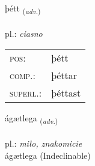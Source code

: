\documentclass[frontgrid, backgrid]{flacards}\usepackage[]{graphicx}\usepackage[]{xcolor}
\begin{document}
\renewcommand{\blhead}{\vskip5pt {\small\bfseries\footnotesize Atviksorð | Adverb }}
\renewcommand{\bcfoot}{\vskip5pt \hspace{2pt}{\small\bfseries\footnotesize 2K}}


{þétt \small{\textsubscript{(\textit{adv.})}} \\[1ex] %
\textphonetic{[θjɛht]} \\
pl.: \emph{ciasno} \\  [2ex]
\renewcommand*{\arraystretch}{0.8}
\begin{tabular}{ll}
\textsc{pos}: & þétt \\ 
\textsc{comp.}: & þéttar \\ 
\textsc{superl.}: & þéttast \\
\end{tabular}
}


\renewcommand{\flhead}{\vskip5pt \fboxsep=0pt {\small\bfseries\footnotesize Atviksorð | Adverb}}
\renewcommand{\fcfoot}{\vskip5pt \fboxsep=0pt \hspace{2pt}{\small\bfseries\footnotesize 2K}}

\renewcommand{\blhead}{\vskip5pt {\small\bfseries\footnotesize Atviksorð | Adverb }}
\renewcommand{\bcfoot}{\vskip5pt \hspace{2pt}{\small\bfseries\footnotesize 2K}}


{ágætlega \small{\textsubscript{(\textit{adv.})}} \\[1ex]
\textphonetic{[auːcaitlɛɣa]} \\
pl.: \emph{miło, znakomicie} \\  [2ex]
ágætlega (Indeclinable)}

\renewcommand{\flhead}{\vskip5pt \fboxsep=0pt {\small\bfseries\footnotesize Sagnorð | Verb}}
\renewcommand{\fcfoot}{\vskip5pt \fboxsep=0pt \hspace{2pt}{\small\bfseries\footnotesize 2K}}

\renewcommand{\blhead}{\vskip5pt {\small\bfseries\footnotesize Sagnorð | Verb }}
\renewcommand{\bcfoot}{\vskip5pt \hspace{2pt}{\small\bfseries\footnotesize 2K}}
\end{document}
